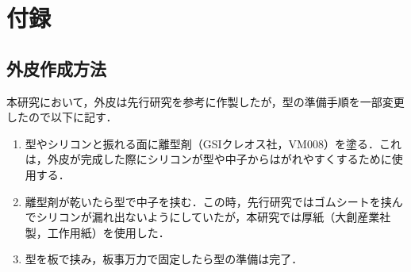 \newpage
\appendix
\setcounter{figure}{0} %
\section{付録}
\subsection{外皮作成方法}
本研究において，外皮は先行研究\cite{kyu}を参考に作製したが，型の準備手順を一部変更したので以下に記す．
\begin{enumerate}
    \item 型やシリコンと振れる面に離型剤（GSIクレオス社，VM008）を塗る．これは，外皮が完成した際にシリコンが型や中子からはがれやすくするために使用する．
    \item 離型剤が乾いたら型で中子を挟む．この時，先行研究\cite{kyu}ではゴムシートを挟んでシリコンが漏れ出ないようにしていたが，本研究では厚紙（大創産業社製，工作用紙）を使用した．
    \item 型を板で挟み，板事万力で固定したら型の準備は完了．
\end{enumerate}


